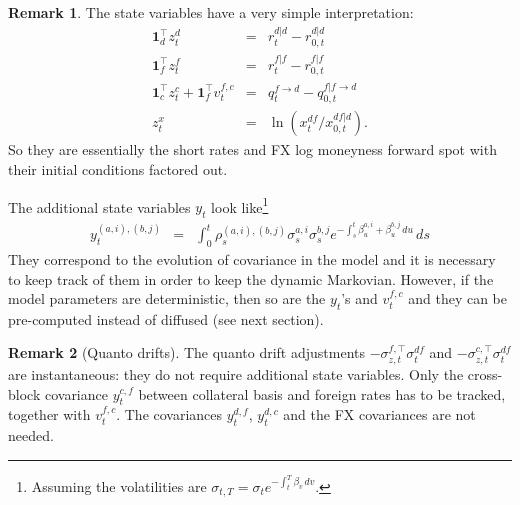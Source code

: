 \documentclass[11pt,english]{amsart}
\newcommand{\vun}{\mathbf{1}}
\theoremstyle{definition}
\newtheorem{rema}{Remark}
\begin{document}
\begin{rema}
The state variables have a very simple interpretation:
\begin{eqnarray*}
  \vun_d^\top z^d_t &=& r^{d|d}_t - r^{d|d}_{0,t} \\
  \vun_f^\top z^f_t &=& r^{f|f}_t - r^{f|f}_{0,t} \\
  \vun_c^\top z^{c}_t  + \vun_f^\top v^{f,c}_t &=& q^{f\to d}_t - q^{f|f\to d}_{0,t} \\
  z^{x}_t &=& \ln\left( x^{df}_t / x^{df|d}_{0,t} \right).
\end{eqnarray*}
So they are essentially the short rates and FX log moneyness forward spot with their initial conditions factored out.

The additional state variables $y_t$ look like\footnote{Assuming the volatilities are $\sigma_{t,T} = \sigma_t e^{-\int_t^T \beta_v\, dv}$.}
\begin{eqnarray}
  y^{(a,i),(b,j)}_{t} &=& \int_0^t \rho^{(a,i),(b,j)}_s \sigma^{a,i}_s  \sigma^{b,j}_s  e^{-\int_s^t \beta^{a,i}_u + \beta^{b,j}_u \, du}  \, ds
\end{eqnarray}
They correspond to the evolution of covariance in the model and it is necessary to keep track of them in order to keep the dynamic Markovian. However, if the model parameters are deterministic, then so are the $y_t$'s and $v^{f,c}_t$ and they can be pre-computed instead of diffused (see next section).
\end{rema}

\begin{rema}[Quanto drifts]
The quanto drift adjustments $-\sigma^{f,\top}_{z,t}\sigma^{df}_t$ and $-\sigma^{c,\top}_{z,t}\sigma^{df}_t$ are instantaneous: they do not require additional state variables. Only the cross-block covariance $y^{c,f}_t$ between collateral basis and foreign rates has to be tracked, together with $v^{f,c}_t$. The covariances $y^{d,f}_t$, $y^{d,c}_t$ and the FX covariances are not needed.
\end{rema}
\end{document}
